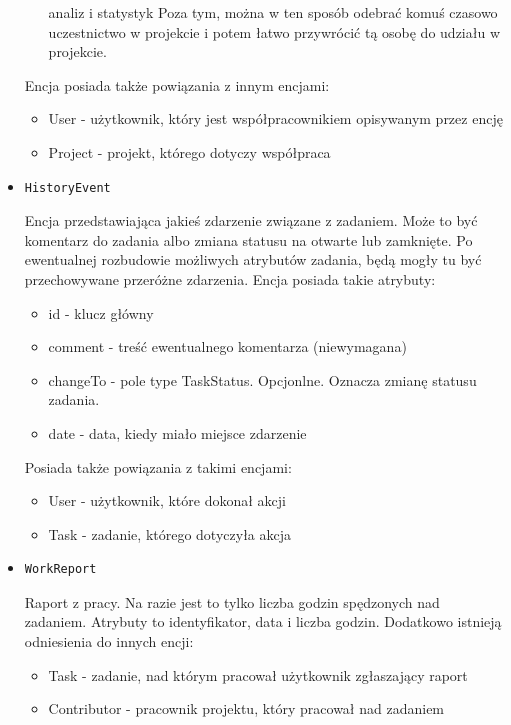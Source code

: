 \documentclass[a4paper,12pt,notitlepage]{mwrep}
\begin{document}
\begin{itemize}
\begin{itemize}
				analiz i statystyk Poza tym, można w ten sposób odebrać komuś czasowo uczestnictwo w projekcie i potem łatwo 
				przywrócić tą osobę do udziału w projekcie.
		\end{itemize}
		Encja posiada także powiązania z innym encjami:
		\begin{itemize}
			\item	User - użytkownik, który jest współpracownikiem opisywanym przez encję
			\item	Project - projekt, którego dotyczy współpraca
		\end{itemize}
	\item	\begin{verbatim}HistoryEvent\end{verbatim} Encja przedstawiająca jakieś zdarzenie związane z zadaniem. Może to być komentarz do zadania 
		albo zmiana statusu na otwarte lub zamknięte. Po ewentualnej rozbudowie możliwych atrybutów zadania, będą mogły tu być przechowywane 
		przeróżne zdarzenia. Encja posiada takie atrybuty:
		\begin{itemize}
			\item	id - klucz główny
			\item	comment - treść ewentualnego komentarza (niewymagana)
			\item	changeTo - pole type TaskStatus. Opcjonlne. Oznacza zmianę statusu zadania.
			\item	date - data, kiedy miało miejsce zdarzenie
		\end{itemize}
		Posiada także powiązania z takimi encjami:
		\begin{itemize}
			\item	User - użytkownik, które dokonał akcji
			\item	Task - zadanie, którego dotyczyła akcja
		\end{itemize}

	\item	\begin{verbatim}WorkReport\end{verbatim} Raport z pracy. Na razie jest to tylko liczba godzin spędzonych nad zadaniem. Atrybuty to 
		identyfikator, data i liczba godzin. Dodatkowo istnieją odniesienia do innych encji:
		\begin{itemize}
			\item	Task - zadanie, nad którym pracował użytkownik zgłaszający raport
			\item	Contributor - pracownik projektu, który pracował nad zadaniem
		\end{itemize}
\end{itemize}
\end{document}
